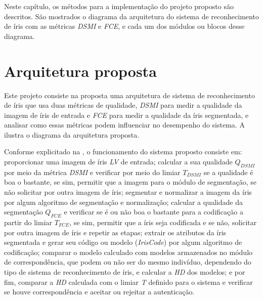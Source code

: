 
\par Neste capítulo, os métodos para a implementação do projeto proposto são descritos. São mostrados o diagrama da arquitetura do sistema de reconhecimento de íris com as métricas \textit{\acrshort{DSMI}} e \textit{\acrshort{FCE}}, e cada um dos módulos ou blocos desse diagrama.


\section{Arquitetura proposta} \label{sec:metodologia:arquitetura}

\par Este projeto consiste na proposta uma arquitetura de sistema de reconhecimento de íris que usa duas métricas de qualidade, \textit{\acrshort{DSMI}} para medir a qualidade da imagem de íris de entrada e \textit{\acrshort{FCE}} para medir a qualidade da íris segmentada, e analisar como essas métricas podem influenciar no desempenho do sistema. A  ilustra o diagrama da arquitetura proposta.


\par Conforme explicitado na , o funcionamento do sistema proposto consiste em: proporcionar uma imagem de íris \textit{\acrfull{LV}} de entrada; calcular a sua qualidade $Q_{DSMI}$ por meio da métrica \textit{\acrshort{DSMI}} e verificar por meio do limiar $T_{DSMI}$ se a qualidade é boa o bastante, se sim, permitir que a imagem para o módulo de segmentação, se não solicitar por outra imagem de íris; segmentar e normalizar a imagem da íris por algum algoritmo de segmentação e normalização; calcular a qualidade da segmentação $Q_{FCE}$ e verificar se é ou não boa o bastante para a codificação a partir do limiar $T_{FCE}$, se sim, permitir que a íris seja codificada e se não, solicitar por outra imagem de íris e repetir as etapas; extrair os atributos da íris segmentada e gerar seu código ou modelo (\textit{IrisCode}) por algum algoritmo de codificação; comparar o modelo calculado com modelos armazenados no módulo de correspondência, que podem ou não ser do mesmo indivíduo, dependendo do tipo de sistema de reconhecimento de íris, e calcular a \textit{\acrfull{HD}} dos modelos; e por fim, comparar a \textit{\acrshort{HD}} calculada com o limiar \textit{T} definido para o sistema e verificar se houve correspondência e aceitar ou rejeitar a autenticação.

